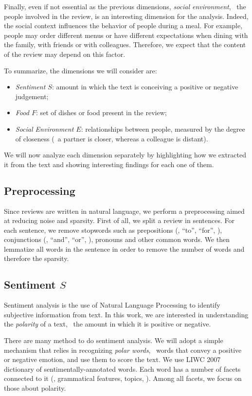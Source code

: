 Finally, even if not essential as the previous dimensions, \emph{social environment}, \ie\ the people involved in the review, is an interesting dimension for the analysis. Indeed, the social context influences the behavior of people during a meal. For example, people may order different menus or have different expectations when dining with the family, with friends or with colleagues. Therefore, we expect that the content of the review may depend on this factor.

To summarize, the dimensions we will consider are:
\begin{itemize}
	\item \emph{Sentiment $S$}: amount in which the text is conceiving a positive or negative judgement;
	\item \emph{Food $F$}: set of dishes or food present in the review;
	\item \emph{Social Environment $E$}: relationships between people, measured by the degree of closeness (\eg\ a partner is closer, whereas a colleague is distant).
\end{itemize}

We will now analyze each dimension separately by highlighting how we extracted it from the text and showing interesting findings for each one of them.

\subsection{Preprocessing}
Since reviews are written in natural language, we perform a preprocessing aimed at reducing noise and sparsity.
First of all, we split a review in sentences. For each sentence, we remove stopwords such as prepositions (\eg, ``to'', ``for'', \etc), conjunctions (\eg, ``and'', ``or'', \etc), pronouns and other common words.
We then lemmatize all words in the sentence in order to remove the number of words and therefore the sparsity.

\subsection{Sentiment $S$}
Sentiment analysis is the use of Natural Language Processing to identify subjective information from text.
In this work, we are interested in understanding the \emph{polarity} of a text, \ie\ the amount in which it is positive or negative.

There are many method to do sentiment analysis. We will adopt a simple mechanism that relies in recognizing \emph{polar words}, \ie\ words that convey a positive or negative emotion, and use them to score the text.
We use LIWC 2007 \cite{pennebaker2001linguistic} dictionary of sentimentally-annotated words. Each word has a number of facets connected to it (\eg, grammatical features, topics, \etc). Among all facets, we focus on those about polarity.

